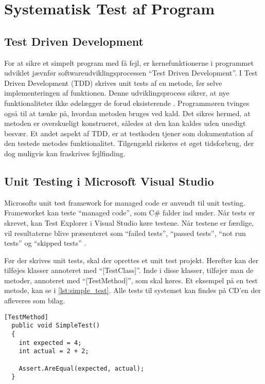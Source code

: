 \section{Systematisk Test af Program}
\label{sec:systematisk_test_af_program}

\subsection{Test Driven Development}
\label{sub:test_driven_development}

For at sikre et simpelt program med få fejl, er kernefunktionerne i programmet udviklet jævnfør softwareudviklingsprocessen \enquote{Test Driven Development}. I Test Driven Development (TDD) skrives unit tests af en metode, før selve implementeringen af funktionen. Denne udviklingsprocess sikrer, at nye funktionaliteter ikke ødelægger de forud eksisterende \cite{martin2006agile}. Programmøren tvinges også til at tænke på, hvordan metoden bruges ved kald. Det sikres hermed, at metoden er overskueligt konstrueret, således at den kan kaldes uden unødigt besvær. Et andet aspekt af TDD, er at testkoden tjener som dokumentation af den testede metodes funktionalitet. Tilgengæld riskeres et øget tidsforbrug, der dog muligvis kan fraskrives fejlfinding.

\subsection{Unit Testing i Microsoft Visual Studio}
\label{sub:unit_testing_i_microsoft_visual_studio}

Microsofts unit test framework for managed code er anvendt til unit testing. Frameworket kan teste \enquote{managed code}, som C\# falder ind under. Når tests er skrevet, kan Test Explorer i Visual Studio køre testene. Når testene er færdige, vil resultaterne blive præsenteret som \enquote{failed tests}, \enquote{passed tests}, \enquote{not run tests} og \enquote{skipped tests} \cite{msdn_unittest}.

Før der skrives unit tests, skal der oprettes et unit test projekt. Herefter kan der tilføjes klasser annoteret med \enquote{[TestClass]}. Inde i disse klasser, tilføjer man de metoder, annoteret med \enquote{[TestMethod]}, som skal køres. Et eksempel på en test metode, kan se i \cref{lst:simple_test}.
Alle tests til systemet kan findes på CD'en der afleveres som bilag.

\begin{lstlisting}[label=lst:simple_test, caption={Eksempel på testfunktion}]
  [TestMethod]
  public void SimpleTest()
  {
    int expected = 4;
    int actual = 2 + 2;

    Assert.AreEqual(expected, actual);
  }
\end{lstlisting}

